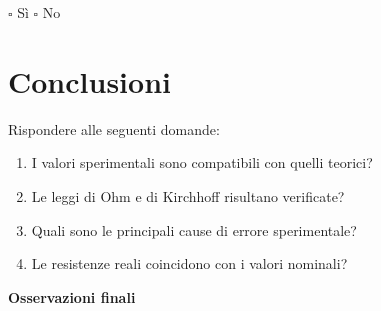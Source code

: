 \documentclass[a4paper,12pt]{article}
\begin{document}
\vspace{0.3cm}

\noindent
$\square$ Sì \hspace{2cm} $\square$ No

\vspace{1cm}

\section*{Conclusioni}

Rispondere alle seguenti domande:

\begin{enumerate}[itemsep=0pt, topsep=1pt]
    \item I valori sperimentali sono compatibili con quelli teorici?
    \item Le leggi di Ohm e di Kirchhoff risultano verificate?
    \item Quali sono le principali cause di errore sperimentale?
    \item Le resistenze reali coincidono con i valori nominali?
\end{enumerate}

\vspace{2cm}

\noindent
\textbf{Osservazioni finali}

\vspace{4cm}
\end{document}
